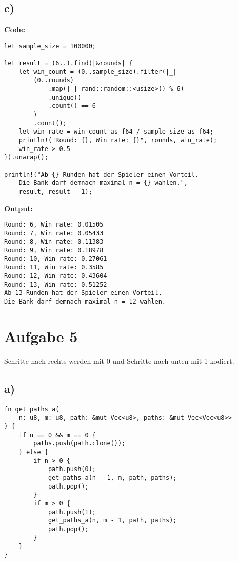 \documentclass[a4paper]{scrartcl}
\begin{document}
\subsection*{c)}
\textbf{Code:}
\begin{lstlisting}
let sample_size = 100000;

let result = (6..).find(|&rounds| {
    let win_count = (0..sample_size).filter(|_| 
        (0..rounds)
            .map(|_| rand::random::<usize>() % 6)
            .unique()
            .count() == 6
        )
        .count();
    let win_rate = win_count as f64 / sample_size as f64;
    println!("Round: {}, Win rate: {}", rounds, win_rate);
    win_rate > 0.5
}).unwrap();

println!("Ab {} Runden hat der Spieler einen Vorteil. 
    Die Bank darf demnach maximal n = {} wahlen.", 
    result, result - 1);
\end{lstlisting}

\textbf{Output:}
\begin{lstlisting}
Round: 6, Win rate: 0.01505
Round: 7, Win rate: 0.05433
Round: 8, Win rate: 0.11383
Round: 9, Win rate: 0.18978
Round: 10, Win rate: 0.27061
Round: 11, Win rate: 0.3585
Round: 12, Win rate: 0.43604
Round: 13, Win rate: 0.51252
Ab 13 Runden hat der Spieler einen Vorteil. 
Die Bank darf demnach maximal n = 12 wahlen.
\end{lstlisting}

\newpage
\section*{Aufgabe 5}
Schritte nach rechts werden mit 0 und Schritte nach unten mit 1 kodiert.
\subsection*{a)}
\begin{lstlisting}
fn get_paths_a(
    n: u8, m: u8, path: &mut Vec<u8>, paths: &mut Vec<Vec<u8>>
) {
    if n == 0 && m == 0 {
        paths.push(path.clone());
    } else {
        if n > 0 {
            path.push(0);
            get_paths_a(n - 1, m, path, paths);
            path.pop();
        }
        if m > 0 {
            path.push(1);
            get_paths_a(n, m - 1, path, paths);
            path.pop();
        }
    }
}
\end{lstlisting}
\end{document}
